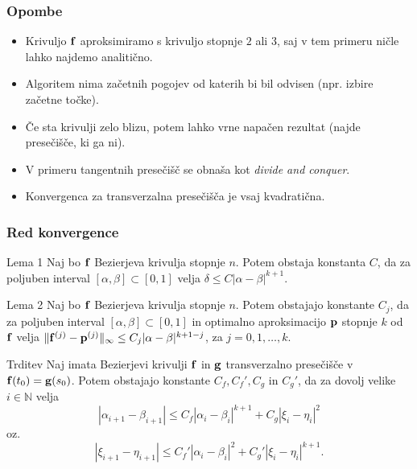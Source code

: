 \documentclass[unknownkeysallowed]{beamer}
\def\N{\mathbb N}
\begin{document}
\begin{frame}
\frametitle{Opombe}
\begin{itemize}
\item Krivuljo ${\bf f}$ aproksimiramo s krivuljo stopnje $2$ ali $3$, saj v tem primeru ničle lahko najdemo analitično.
\medskip
\item Algoritem nima začetnih pogojev od katerih bi bil odvisen (npr. izbire začetne točke).
\medskip
\item Če sta krivulji zelo blizu, potem lahko vrne napačen rezultat (najde presečišče, ki ga ni).
\medskip
\item V primeru tangentnih presečišč se obnaša kot {\em divide and conquer}.
\medskip
\item Konvergenca za transverzalna presečišča je vsaj kvadratična.
\end{itemize}
\end{frame}


\begin{frame}
\frametitle{Red konvergence}
\begin{small}
\begin{block}{Lema 1}
Naj bo ${\bf f}$ Bezierjeva krivulja stopnje $n$. Potem obstaja konstanta $C$, da za poljuben interval $[\alpha,\beta]\subset[0,1]$ velja $\delta \leq C |\alpha - \beta|^{k+1}$.
\end{block}

\begin{block}{Lema 2}
Naj bo ${\bf f}$ Bezierjeva krivulja stopnje $n$. Potem obstajajo konstante $C_{j}$, da za poljuben interval $[\alpha,\beta]\subset[0,1]$ in optimalno aproksimacijo ${\bf p}$ stopnje $k$ od ${\bf f}$ velja
$\lVert {\bf f}^{(j)} - {\bf p}^{(j)} \rVert _{\infty} \leq C_{j}|\alpha - \beta|^{k+1-j}$, za $j=0,1,\ldots,k$. 
\end{block}

\begin{block}{Trditev}
Naj imata Bezierjevi krivulji ${\bf f}$ in ${\bf g}$ transverzalno presečišče v ${\bf f}(t_0)={\bf g}(s_0)$. Potem obstajajo konstante $C_f, C_f', C_g$ in $C_g'$, da za dovolj velike $i\in \N$ velja
$$
|\alpha _{i+1} - \beta _{i+1}| \leq C_f |\alpha _{i} - \beta _{i}|^{k+1} + C_g|\xi _{i} - \eta _{i}|^2
$$
oz.
$$
|\xi _{i+1} - \eta _{i+1}| \leq C_f' |\alpha _{i} - \beta _{i}|^{2} + C_g'|\xi _{i} - \eta _{i}|^{k+1}.
$$

\end{block}
\end{small}
\end{frame}
\end{document}
